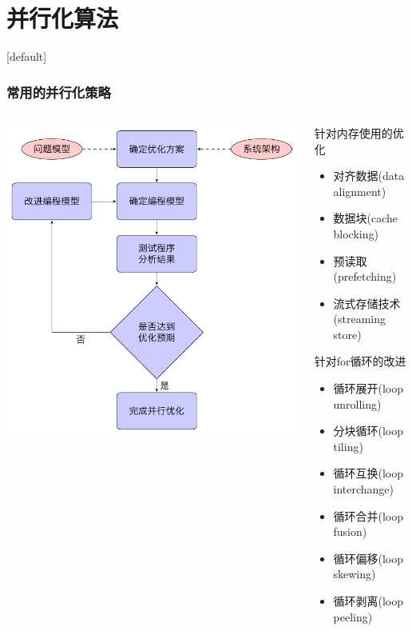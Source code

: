 \documentclass{beamer}
\makeatletter
\newenvironment{withoutheadline}{
  \setbeamertemplate{headline}[default]
  \def\beamer@entrycode{\vspace*{-\headheight}}
}{}
\makeatother
\begin{document}
\section{并行化算法} %
\label{sec:algorithm}

\begin{withoutheadline}
\begin{frame}
	\frametitle{常用的并行化策略}
	\begin{columns}
		\begin{column}[T]{0.48\textwidth}
			\includegraphics[width=\textwidth]{Figures/algorithm/tikz/flowchart1.pdf}
		\end{column}\hfill
		\begin{column}[T]{0.48\textwidth}
				 针对内存使用的优化
					\begin{itemize}
						\item 对齐数据(data alignment)
						\item 数据块(cache blocking)
						\item 预读取(prefetching)
						\item 流式存储技术(streaming store)
					\end{itemize}
				 针对for循环的改进
					\begin{itemize}
						\item 循环展开(loop unrolling)
						\item 分块循环(loop tiling)
						\item 循环互换(loop interchange)
						\item 循环合并(loop fusion)
						\item 循环偏移(loop skewing)
						\item 循环剥离(loop peeling)
					\end{itemize}
		\end{column}
	\end{columns}
	\end{frame}
\end{withoutheadline}
\end{document}
